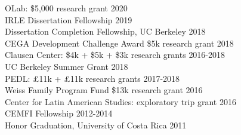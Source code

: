 \documentclass[10pt]{article}
\renewcommand{\section}[1]{\pagebreak[3]%
		\hyphenpenalty=10000%
		\vspace{1.3\baselineskip}%
		\phantomsection\addcontentsline{toc}{section}{#1}%
		\noindent\llap{\scshape\smash{\parbox[t]{\marginparwidth}{\raggedright #1}}}%
		\vspace{-\baselineskip}\par}
\begin{document}
OLab: \$5,000 research grant \hfill {2020}\\
{IRLE Dissertation Fellowship} \hfill {2019}\\
{Dissertation Completion Fellowship, UC Berkeley} \hfill {2018}\\
{CEGA Development Challenge Award} \$5k research grant \hfill {2018} \\
{Clausen Center:} \$4k + \$5k + \$3k research grants \hfill {2016-2018}\\
{UC Berkeley Summer Grant} \hfill {2018}\\
{PEDL:} \pounds 11k + \pounds 11k research grants \hfill {2017-2018}\\
{Weiss Family Program Fund} \$13k research grant \hfill {2016}\\
{Center for Latin American Studies:} exploratory trip grant \hfill { 2016}\\
{CEMFI Fellowship} \hfill {2012-2014}\\
{Honor Graduation, University of Costa Rica} \hfill {2011} \\

%
%
%
%
\end{document}
